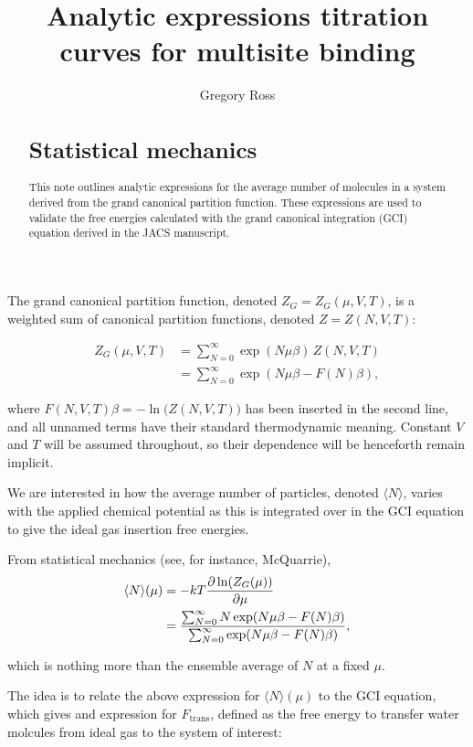 \documentclass[10pt,a4paper]{article}
\author{Gregory Ross}
\title{Analytic expressions titration curves for multisite binding  }
\begin{document}
\maketitle
\begin{abstract}

\section{Statistical mechanics}
This note outlines analytic expressions for the average number of molecules in a system derived from the grand canonical partition function. These expressions are used to validate the free energies calculated with the grand canonical integration (GCI) equation derived in the JACS manuscript. 
\end{abstract}

The grand canonical partition function, denoted $Z_G = Z_G(\mu,V,T)$, is a weighted sum of canonical partition functions, denoted $Z = Z(N,V,T)$:

\begin{align}
Z_G(\mu,V,T) &= \sum_{N=0}^\infty \exp(N\mu\beta) \, Z(N,V,T) \\
&= \sum_{N=0}^\infty \exp(N\mu\beta - F(N)\beta),
\end{align}

where $F(N,V,T)\beta = -\ln\big(Z(N,V,T)\big)$ has been inserted in the second line, and all unnamed terms have their standard thermodynamic meaning. Constant $V$ and $T$ will be assumed throughout, so their dependence will be henceforth remain implicit.

We are interested in how the average number of particles, denoted $\langle N \rangle$, varies with the applied chemical potential as this is integrated over in the GCI equation to give the ideal gas insertion free energies.  

From statistical mechanics (see, for instance, McQuarrie), 
\begin{align}
\langle N \rangle(\mu) &= -kT\frac{\partial\ln(Z_G(\mu))}{\partial\mu} \notag\\
&= \frac{\sum_{N=0}^\infty N\exp(N\mu\beta - F(N)\beta)}{\sum_{N=0}^\infty \exp(N\mu\beta - F(N)\beta)},
\label{eq:aveN}
\end{align}

which is nothing more than the ensemble average of $N$ at a fixed $\mu$.

The idea is to relate the above expression for $\langle N \rangle(\mu)$ to the GCI equation, which gives and expression for $F_\text{trans}$, defined as the free energy to transfer water molcules from ideal gas to the system of interest:
\end{document}

